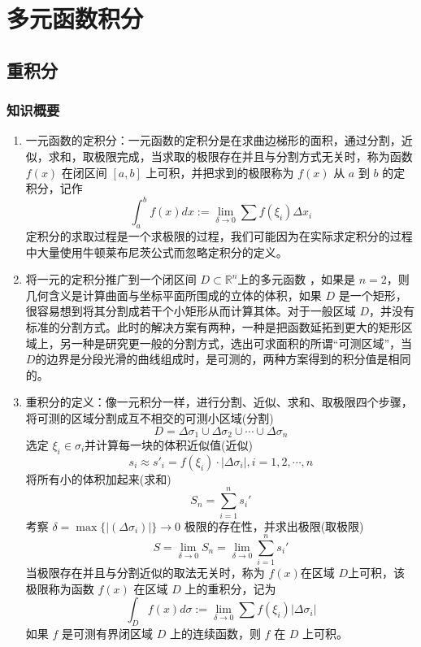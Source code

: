 \section{多元函数积分}
\subsection{重积分}
\subsubsection{知识概要}
\begin{enumerate}
    \item 一元函数的定积分：一元函数的定积分是在求曲边梯形的面积，通过分割，近似，求和，取极限完成，当求取的极限存在并且与分割方式无关时，称为函数 $f(x)$ 在闭区间 $[a, b]$ 上可积，并把求到的极限称为 $f(x)$ 从 $a$ 到 $b$ 的定积分，记作
    $$
    \int_a^bf(x)dx:=\lim_{\delta\to0}\sum f(\xi_i)\Delta x_i
    $$
    定积分的求取过程是一个求极限的过程，我们可能因为在实际求定积分的过程中大量使用牛顿莱布尼茨公式而忽略定积分的定义。

    \item 将一元的定积分推广到一个闭区间 $ D \subset \mathbb{R}^n$上的多元函数 ，如果是 $n=2$，则几何含义是计算曲面与坐标平面所围成的立体的体积，如果 $D$ 是一个矩形，很容易想到将其分割成若干个小矩形从而计算其体。对于一般区域 $D$，并没有标准的分割方式。此时的解决方案有两种，一种是把函数延拓到更大的矩形区域上，另一种是研究更一般的分割方式，选出可求面积的所谓“可测区域”，当 $D$的边界是分段光滑的曲线组成时，是可测的，两种方案得到的积分值是相同的。

    \item  重积分的定义：像一元积分一样，进行分割、近似、求和、取极限四个步骤，将可测的区域分割成互不相交的可测小区域(分割)
    $$
    D=\Delta\sigma_1\cup\Delta\sigma_2\cup\cdots\cup\Delta\sigma_n
    $$
    选定 $\xi _i \in \sigma_i$并计算每一块的体积近似值(近似)
    $$
    s_i\approx s'_i=f(\xi_i)\cdot|\Delta\sigma_i|, i=1,2,\cdots,n
    $$
    将所有小的体积加起来(求和)
    $$
    S_n=\sum_{i=1}^n s_i'
    $$
    考察 $ \delta=\max\{|(\Delta\sigma_i)|\}\to 0 $ 极限的存在性，并求出极限(取极限)
    $$
    S=\lim_{\delta\to0}S_n=\lim_{\delta\to0}\sum_{i=1}^ns_i'
    $$
    当极限存在并且与分割近似的取法无关时，称为 $f(x)$在区域 $D$上可积，该极限称为函数 $f(x)$ 在区域 $D$ 上的重积分，记为
    $$
    \int_Df(x)d\sigma:=\lim_{\delta\to0}\sum f(\xi_i)|\Delta\sigma_i|
    $$
    如果 $f$ 是可测有界闭区域 $D$ 上的连续函数，则 $f$ 在 $D$ 上可积。


\end{enumerate}
